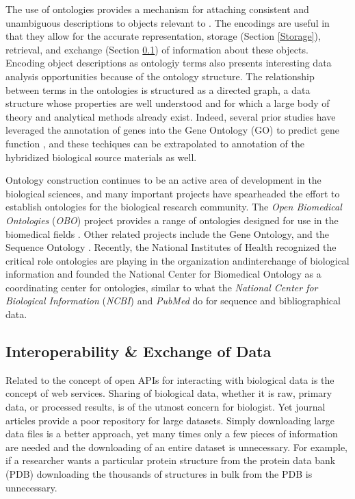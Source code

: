 The use of ontologies provides a mechanism for attaching consistent and
unambiguous descriptions to objects relevant to \dbthesis.  The encodings are
useful in that they allow for the accurate representation, storage (Section
\ref{Storage}), retrieval, and exchange (Section \ref{Protocol}) of information
about these objects.  Encoding object descriptions as ontologiy terms also
presents interesting data analysis opportunities because of the ontology
structure.   The relationship between terms in the ontologies is structured as
a directed graph, a data structure whose properties are well understood and for
which a large body of theory and analytical methods already exist.  Indeed,
several prior studies have leveraged the annotation of genes into the Gene
Ontology (GO) \cite{go} to predict gene function \cite{shortestpath, pachinko,
termtissue}, and these techiques can be extrapolated to annotation of the
hybridized biological source materials as well.

Ontology construction continues to be an active area of development in the
biological sciences, and many important projects have spearheaded the effort to
establish ontologies for the biological research community.  The \emph{Open
Biomedical Ontologies} (\emph{OBO}) project provides a range of ontologies
designed for use in the biomedical fields \cite{obo}.  Other related projects
include the Gene Ontology, and the Sequence Ontology \cite{go,so}.  Recently,
the National Institutes of Health recognized the critical role ontologies are
playing in the organization andinterchange of biological information and
founded the National Center for Biomedical Ontology \cite{ncbo} as a
coordinating center for ontologies, similar to what the \emph{National Center
for Biological Information} (\emph{NCBI}) \cite{ncbi} and \emph{PubMed}
\cite{pubmed} do for sequence and bibliographical data.

\subsection{Interoperability \& Exchange of Data}\label{Protocol}

Related to the concept of open APIs for interacting with biological data is the
concept of web services.  Sharing of biological data, whether it is raw,
primary data, or processed results, is of the utmost concern for biologist.
Yet journal articles provide a poor repository for large datasets.  Simply
downloading large data files is a better approach, yet many times only a few
pieces of information are needed and the downloading of an entire dataset is
unnecessary.  For example, if a researcher wants a particular protein structure
from the protein data bank (PDB) \cite{pdb} downloading the thousands of
structures in bulk from the PDB is unnecessary.

